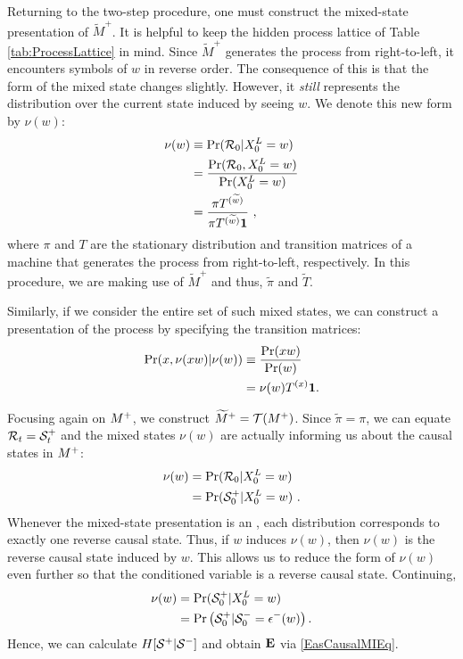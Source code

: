 Returning to the two-step procedure, one must construct the mixed-state 
presentation of $\widetilde{M}^+$. It is helpful to keep the hidden process 
lattice of Table \ref{tab:ProcessLattice} in mind.  Since $\widetilde{M}^+$ 
generates the process from right-to-left, it encounters symbols of $w$ in 
reverse order. The consequence of this is that the form of the mixed state 
changes slightly. However, it \textit{still} represents the distribution over
the current state induced by seeing $w$. We denote
this new form by $\nu(w)$:
\begin{align}
\label{mixedstatesrev}
\nu(w) &\equiv
    \Pr(\mathcal{R}_0 | {X}_0^L=w) \\
  & = 
\frac{\Pr(\mathcal{R}_0, {X}_0^L=w)}{\Pr({X}_0^L=w)} \\
  &= \frac{\pi T^{(\widetilde{w})}}
          {\pi T^{(\widetilde{w})}\mathbf{1}} ~,
\end{align}
where $\pi$ and $T$ are the stationary distribution and transition matrices of
a machine that generates the process from right-to-left, respectively. In this
procedure, we are making use of $\widetilde{M}^+$ and thus, $\widetilde{\pi}$
and $\widetilde{T}$.

Similarly, if we consider the entire set of such mixed states, we can construct 
a presentation of the process by specifying the transition matrices:
\begin{align}
\Pr({x}, \nu({x} w) | \nu(w))
	& \equiv \frac{\Pr(xw)}{\Pr(w)} \\
  & = \nu(w) T^{(x)} \mathbf{1}.
\label{transitionrev}
\end{align}

Focusing again on ${M}^{+}$, we construct $\widetilde{M}^+ = \mathcal{T}({M}^{+})$.
Since $\widetilde{\pi} = \pi$, we can equate 
  $\mathcal{R}_t = {\mathcal{S}}^{+}_t$
and the mixed states $\nu(w)$ are actually
informing us about the causal states in ${M}^{+}$:
\begin{align*}
\nu(w) &= \Pr(\mathcal{R}_0 | {X}_0^L=w)\\
       &= \Pr({\mathcal{S}}^{+}_0 | {X}_0^L=w) ~.
\end{align*}
Whenever the mixed-state presentation is an \eM, each distribution corresponds
to exactly one reverse causal state.  Thus, if $w$ induces $\nu(w)$, then
$\nu(w)$ is the reverse causal state induced by $w$.  This allows us to 
reduce the form of $\nu(w)$ even further so that the conditioned variable 
is a reverse causal state. Continuing,
\begin{align*}
\nu(w) &= \Pr({\mathcal{S}}^{+}_0 | {X}_0^L=w)\\
       &= \Pr\left({\mathcal{S}}^{+}_0 | {\mathcal{S}}^{-}_0 = \epsilon^{-}(w)\right).
\end{align*}
Hence, we can calculate $H[{\mathcal{S}}^{+}|{\mathcal{S}}^{-}]$ and 
obtain ${\bf E}$ via \eqref{EasCausalMIEq}.

